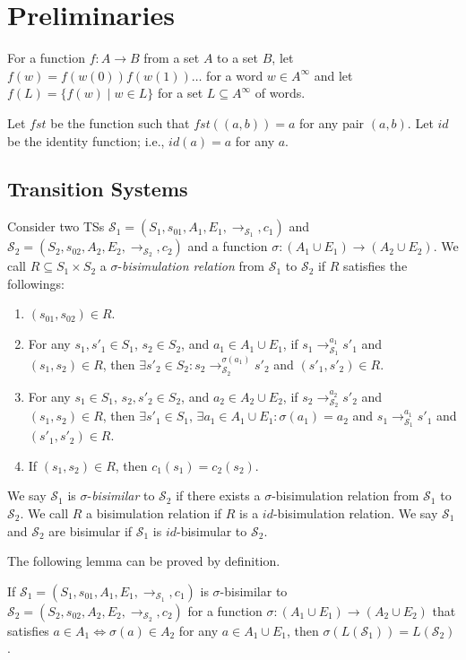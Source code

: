 \documentclass[oribibl,envcountsame,dvipdfmx]{llncs}
\newcommand{\calS}{\mathcal{S}}
\newcommand{\fst}{\mathit{fst}}
\begin{document}
\section*{Preliminaries}

For a function $f:A\to B$ from a set $A$ to a set $B$,
let $f(w)=f(w(0))f(w(1))\ldots$ for a word $w\in A^{\infty}$
and let $f(L)=\{f(w)\mid w\in L\}$ for a set $L\subseteq A^{\infty}$
of words.

Let $\fst$ be the function such that $\fst((a,b))=a$ for any pair $(a,b)$.
Let $\mathit{id}$ be the identity function; i.e.,
$\mathit{id}(a)=a$ for any $a$.

\subsection*{Transition Systems}

Consider two TSs
$\calS_1=(S_1,s_{01},A_1,E_1,{\to_{\calS_1}},c_1)$ and
$\calS_2=(S_2,s_{02},A_2,E_2,{\to_{\calS_2}},\allowbreak c_2)$
and
a function $\sigma:(A_1\cup E_1)\to(A_2\cup E_2)$.
We call $R\subseteq S_1\times S_2$
a $\sigma$-\emph{bisimulation relation} from $\calS_1$ to $\calS_2$
if $R$ satisfies the followings:
\begin{enumerate}[label=(\arabic*)]
\item $(s_{01},s_{02})\in R$.
\item For any $s_1,s'_1\in S_1$, $s_2\in S_2$, and
  $a_1\in A_1\cup E_1$,
  if $s_1\to_{\calS_1}^{a_1} s'_1$ and $(s_1,s_2)\in R$,
  then $\exists s'_2\in S_2: s_2\to_{\calS_2}^{\sigma(a_1)} s'_2$
  and $(s'_1,s'_2)\in R$.
\item For any $s_1\in S_1$, $s_2,s'_2\in S_2$, and
  $a_2\in A_2\cup E_2$,
  if $s_2\to_{\calS_2}^{a_2} s'_2$ and $(s_1,s_2)\in R$,
  then $\exists s'_1\in S_1$, $\exists a_1\in A_1\cup E_1:
  \sigma(a_1)=a_2$ and
  $s_1\to_{\calS_1}^{a_1} s'_1$
  and $(s'_1,s'_2)\in R$.
\item If $(s_1,s_2)\in R$, then $c_1(s_1)=c_2(s_2)$.
\end{enumerate}
%
We say $\calS_1$ is $\sigma$-\emph{bisimilar} to
$\calS_2$ if there exists a $\sigma$-bisimulation relation
from $\calS_1$ to $\calS_2$.
%
We call $R$ a bisimulation relation
if $R$ is a $\mathit{id}$-bisimulation relation.
We say $\calS_1$ and $\calS_2$ are bisimular if
$\calS_1$ is $\mathit{id}$-bisimular to $\calS_2$.

The following lemma can be proved by definition.
\begin{lemma}\label{lemma:bisim-lang}
If
$\calS_1=(S_1,s_{01},A_1,E_1,{\to_{\calS_1}},c_1)$ is
$\sigma$-bisimilar to
$\calS_2=(S_2,s_{02},A_2,\allowbreak E_2,{\to_{\calS_2}},c_2)$
for
a function $\sigma:(A_1\cup E_1)\to(A_2\cup E_2)$
that satisfies $a\in A_1 \Leftrightarrow \sigma(a)\in A_2$
for any $a\in A_1\cup E_1$,
then
$\sigma(L(\calS_1))=L(\calS_2)$.
\end{lemma}
\end{document}
